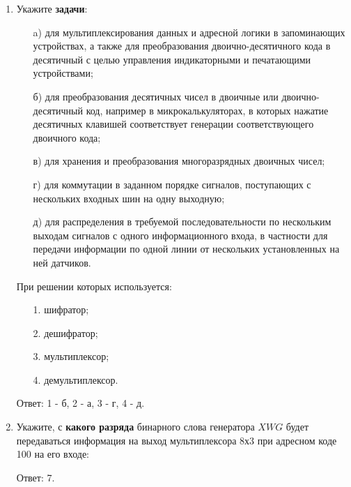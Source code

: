 \documentclass[spec, och, labwork]{shiza}
\begin{document}
\begin{enumerate}
        \item Укажите \textbf{задачи}:
        
        \begin{enumerate}
            \item[a)] для мультиплексирования данных и адресной логики в запоминающих
            устройствах, а также для преобразования двоично-десятичного кода в 
            десятичный с целью управления индикаторными и печатающими устройствами;

            \item[б)] для преобразования десятичных чисел в двоичные или двоично-десятичный
            код, например в микрокалькуляторах, в которых нажатие десятичных
            клавишей соответствует генерации соответствующего двоичного кода;

            \item[в)] для хранения и преобразования многоразрядных двоичных чисел;
            
            \item[г)] для коммутации в заданном порядке сигналов, поступающих с
            нескольких входных шин на одну выходную;

            \item[д)] для распределения в требуемой последовательности по нескольким 
            выходам сигналов с одного информационного входа, в частности для передачи 
            информации по одной линии от нескольких установленных на ней датчиков.
        \end{enumerate}
        
        При решении которых используется:
        \begin{enumerate}
            \item[1.] шифратор;
            \item[2.] дешифратор;
            \item[3.] мультиплексор;
            \item[4.] демультиплексор.
        \end{enumerate}

        Ответ: 1 - б, 2 - а, 3 - г, 4 - д.

        \item Укажите, с \textbf{какого разряда} бинарного слова генератора $XWG$ будет
        передаваться информация на выход мультиплексора 8х3 при адресном коде 100
        на его входе:
        
        Ответ: 7.


\end{enumerate}
\end{document}
